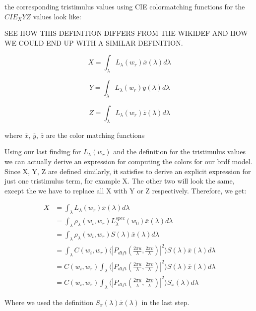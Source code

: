 the corresponding tristimulus values using CIE colormatching functions for the $CIE_XYZ$ values look like:

SEE HOW THIS DEFINITION DIFFERS FROM THE WIKIDEF AND HOW WE COULD END UP WITH A SIMILAR DEFINITION.

\begin{equation}
X = \int_{\lambda}L_\lambda(w_r)\overline{x}(\lambda)d\lambda
\end{equation} 

\begin{equation}
Y = \int_{\lambda}L_\lambda(w_r)\overline{y}(\lambda)d\lambda
\end{equation}

\begin{equation}
Z = \int_{\lambda}L_\lambda(w_r)\overline{z}(\lambda)d\lambda
\end{equation}

where $\overline{x}$, $\overline{y}$, $\overline{z}$ are the color matching functions

Using our last finding for $L_\lambda(w_r)$ and the definition for the tristimulus values we can actually derive an expression for computing the colors for our brdf model. Since X, Y, Z are defined similarly, it satisfies to derive an explicit expression for just one tristimulus term, for example X. The other two will look the same, except the we have to replace all X with Y or Z respectively. Therefore, we get:

\begin{align*}
X 
& =\int_{\lambda}L_\lambda(w_r)\overline{x}(\lambda)d\lambda \\
& =\int_{\lambda}\rho_\lambda(w_i,w_r)L_\lambda^{spec}(w_0) \overline{x}(\lambda)d\lambda \\
& =\int_{\lambda}\rho_\lambda(w_i,w_r) S(\lambda) \overline{x}(\lambda)d\lambda \\
& =\int_{\lambda} C(w_i,w_r) \langle \left|P_{dtft}(\frac{2\pi u}{\lambda}, \frac{2\pi v}{\lambda})\right|^2\rangle S(\lambda) \overline{x}(\lambda)d\lambda \\
& = C(w_i,w_r) \int_{\lambda} \langle \left|P_{dtft}(\frac{2\pi u}{\lambda}, \frac{2\pi v}{\lambda})\right|^2\rangle S(\lambda) \overline{x}(\lambda)d\lambda \\
& = C(w_i,w_r) \int_{\lambda} \langle \left|P_{dtft}(\frac{2\pi u}{\lambda}, \frac{2\pi v}{\lambda})\right|^2\rangle S_x(\lambda)d\lambda
\end{align*}

Where we used the definition $S_x(\lambda)\overline{x}(\lambda)$ in the last step.

